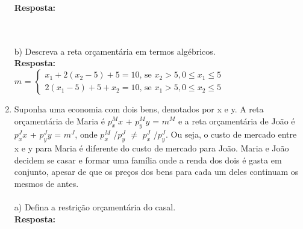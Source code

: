 \begin{enumerate}
\textbf{Resposta:}\\

\begin{center}
					\\
\end{center}

\paragraph{} b) Descreva a reta orçamentária em termos algébricos.
\\

\textbf{Resposta:}\\

$m$ = 
$\begin{cases}
x_{1}+2(x_{2}-5)+5=10 \textrm{, se } x_{2}>5, 0\leq x_{1} \leq5\\
2(x_{1}-5)+5+x_{2}=10 \textrm{, se } x_{1}>5, 0\leq x_{2} \leq5
\end{cases}$\\

\item Suponha uma economia com dois bens, denotados por x e y. A reta orçamentária de Maria é {$p^M_xx$} + {$p^M_yy$} = {$m^M$} e a reta orçamentária de João é {$p^J_xx$} + {$p^J_yy$} = {$m^J$}, onde {$p^M_x$} /{$p^J_y$} {$\neq$} {$p^J_x$} /{$p^J_y$}. Ou seja, o custo de mercado entre x e y para Maria é diferente do custo de mercado para João. Maria e João decidem se casar e formar uma família onde a renda dos dois é gasta em conjunto, apesar de que os preços dos bens para cada um deles continuam os mesmos de antes.

\paragraph{} a) Deﬁna a restrição orçamentária do casal.
\\

\textbf{Resposta:}\\


\end{enumerate}
